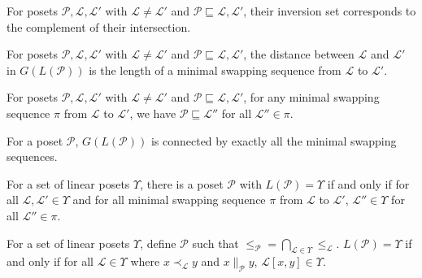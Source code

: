 \documentclass[12pt]{llncs}
\let\oldleq\leq
\renewcommand{\leq}[1][]{\oldleq_{#1}}
\newcommand{\poset}[1]{\mathcal{#1}}
\newcommand{\lang}[1]{L(#1)}
\newcommand{\sgraph}[1]{G(#1)}
\newcommand{\lext}{\sqsubseteq}
\newcommand{\incomp}[1][]{\parallel_{#1}}
\newcommand{\covered}[1][]{\prec_{#1}}
\newcommand{\swapfn}[2]{#1[#2]}
\begin{document}
\begin{lemma}
    For posets $\poset{P},\poset{L},\poset{L}'$ with $\poset{L} \!\neq\! \poset{L}'$ and $\poset{P} \lext \poset{L},\poset{L}'$, their inversion set corresponds to the complement of their intersection.
\end{lemma}

\begin{lemma}[\cite{R}]
    For posets $\poset{P},\poset{L},\poset{L}'$ with $\poset{L} \!\neq\! \poset{L}'$ and $\poset{P} \lext \poset{L},\poset{L}'$, the distance between $\poset{L}$ and $\poset{L}'$ in $\sgraph{\lang{\poset{P}}}$ is the length of a minimal swapping sequence from $\poset{L}$ to $\poset{L}'$.
\end{lemma}

\begin{lemma}
    For posets $\poset{P},\poset{L},\poset{L}'$ with $\poset{L} \!\neq\! \poset{L}'$ and $\poset{P} \lext \poset{L},\poset{L}'$, for any minimal swapping sequence $\pi$ from $\poset{L}$ to $\poset{L}'$, we have $\poset{P} \lext \poset{L}''$ for all $\poset{L}'' \!\in\! \pi$.
\end{lemma}

\begin{theorem}
    For a poset $\poset{P}$, $\sgraph{\lang{\poset{P}}}$ is connected by exactly all the minimal swapping sequences.
\end{theorem}

\begin{corollary}
    For a set of linear posets $\Upsilon$, there is a poset $\poset{P}$ with $\lang{\poset{P}} = \Upsilon$ if and only if for all $\poset{L}, \poset{L}' \!\in\! \Upsilon$ and for all minimal swapping sequence $\pi$ from $\poset{L}$ to $\poset{L}'$, $\poset{L}'' \!\in\! \Upsilon$ for all $\poset{L}'' \!\in\! \pi$.
\end{corollary}

\begin{corollary}
    For a set of linear posets $\Upsilon$, define $\poset{P}$ such that $\leq[\poset{P}] = \bigcap_{\poset{L} \in \Upsilon} \leq[\poset{L}]$. $\lang{\poset{P}} = \Upsilon$ if and only if for all $\poset{L} \!\in\! \Upsilon$ where $x \covered[\poset{L}] y$ and $x \incomp[\poset{P}] y$, $\swapfn{\poset{L}}{x,y} \!\in\! \Upsilon$.
\end{corollary}



\end{document}
